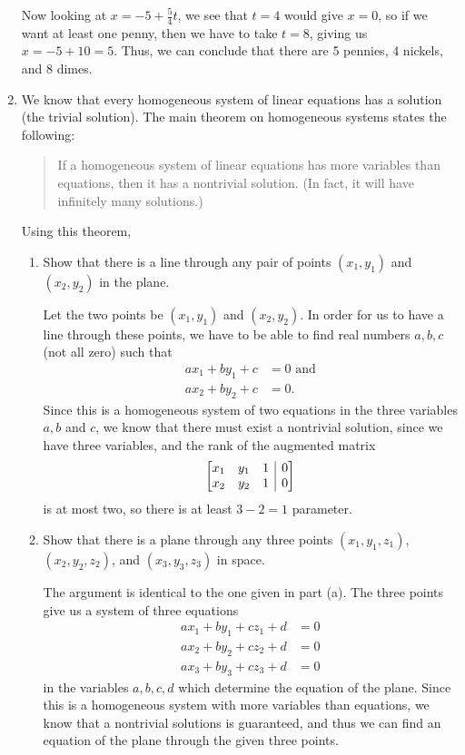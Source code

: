 \documentclass[letterpaper,12pt]{article}
\makeatletter
\newenvironment{amatrix}[1]{%
  \left[\begin{array}{@{}*{#1}{c}|c@{}}
}{%
  \end{array}\right]
}
\makeatother
\begin{document}
\begin{enumerate}
Now looking at $x=-5+\frac{5}{4}t$, we see that $t=4$ would give $x=0$, so if we want at least one penny, then we have to take $t=8$, giving us $x=-5+10=5$. Thus, we can conclude that there are 5 pennies, 4 nickels, and 8 dimes.

\bigskip
 
 \item We know that every homogeneous system of linear equations has a solution (the trivial solution). The main theorem on homogeneous systems states the following:
 \begin{quotation}
 If a homogeneous system of linear equations has more variables than equations, then it has a nontrivial solution. (In fact, it will have infinitely many solutions.)
 \end{quotation}
 Using this theorem,
 \begin{enumerate}
 \item Show that there is a line through any pair of points $(x_1,y_1)$ and $(x_2,y_2)$ in the plane.

\bigskip

Let the two points be $(x_1,y_1)$ and $(x_2,y_2)$. In order for us to have a line through these points, we have to be able to find real numbers $a,b,c$ (not all zero) such that
\begin{align*}
 ax_1+by_1+c & = 0 \text{ and}\\
 ax_2+by_2+c & = 0.
\end{align*}
Since this is a homogeneous system of two equations in the three variables $a, b$ and $c$, we know that there must exist a nontrivial solution, since we have three variables, and the rank of the augmented matrix
\[
 \begin{amatrix}{3}
  x_1&y_1&1&0\\x_2&y_2&1&0
 \end{amatrix}
\]
is at most two, so there is at least $3-2=1$ parameter.

\bigskip

 \item Show that there is a plane through any three points $(x_1,y_1,z_1)$, $(x_2,y_2,z_2)$, and $(x_3,y_3,z_3)$ in space.

\bigskip

The argument is identical to the one given in part (a). The three points give us a system of three equations
\begin{align*}
 ax_1+by_1+cz_1+d & = 0\\
ax_2+by_2+cz_2+d & = 0\\
ax_3+by_3+cz_3+d & = 0
\end{align*}
in the variables $a,b,c,d$ which determine the equation of the plane. Since this is a homogeneous system with more variables than equations, we know that a nontrivial solutions is guaranteed, and thus we can find an equation of the plane through the given three points.
 \end{enumerate}
 

\end{enumerate}
\end{document}
